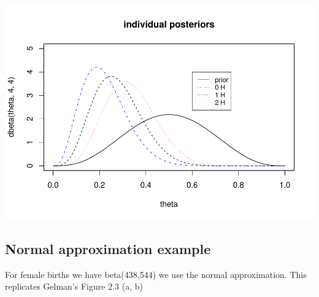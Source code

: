 \documentclass[
]{book}
\theoremstyle{definition}
\theoremstyle{definition}
\theoremstyle{definition}
\theoremstyle{definition}
\theoremstyle{remark}
\begin{document}
\includegraphics{_main_files/figure-latex/unnamed-chunk-11-1.pdf}

\hypertarget{normal-approximation-example}{%
\subsection*{Normal approximation example}\label{normal-approximation-example}}

For female births we have beta(438,544) we use the normal approximation. This replicates Gelman's Figure 2.3 (a, b)
\end{document}
